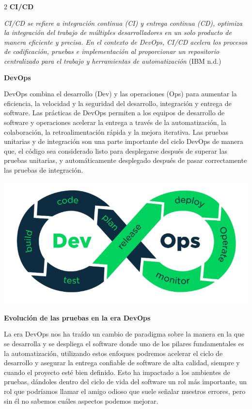 \documentclass[12pt,spanish,Letterpaper,openany]{book}
\begin{document}
\begin {multicols}{2}
\textbf{CI/CD}

\emph{CI/CD se refiere a integración continua (CI) y entrega continua (CD), optimiza la integración del trabajo de múltiples desarrolladores en un solo producto de manera eficiente y precisa. En el contexto de DevOps, CI/CD acelera los procesos de codificación, pruebas e implementación al proporcionar un repositorio centralizado para el trabajo y herramientas de automatización} (IBM n.d.)

\textbf{DevOps}

DevOps combina el desarrollo (Dev) y las operaciones (Ops) para aumentar la eficiencia, la velocidad y la seguridad del desarrollo, integración y entrega de software. Las prácticas de DevOps permiten a los equipos de desarrollo de software y operaciones acelerar la entrega a través de la automatización, la colaboración, la retroalimentación rápida y la mejora iterativa. Las pruebas unitarias y de integración son una parte importante del ciclo DevOps de manera que, el código sea considerado listo para desplegarse después de superar las pruebas unitarias, y automáticamente desplegado después de pasar correctamente las pruebas de integración.

\begin {flushleft}
\noindent\begin{minipage}[c]{\columnwidth}

\begin{center}\includegraphics[width=1\linewidth]{imagenes_articulos/sp08_01} \end{center}

\end{minipage}
\end {flushleft}

\textbf{Evolución de las pruebas en la era DevOps}

La era DevOps nos ha traído un cambio de paradigma sobre la manera en la que se desarrolla y se despliega el software donde uno de los pilares fundamentales es la automatización, utilizando estos enfoques podremos acelerar el ciclo de desarrollo y asegurar la entrega confiable de software de alta calidad, siempre y cuando el proyecto esté bien definido. Esto ha impactado a los ambientes de pruebas, dándoles dentro del ciclo de vida del software un rol más importante, un rol que podríamos llamar el amigo odioso que suele señalar nuestros errores, pero sin él no sabemos cuáles aspectos podemos mejorar.


\end{multicols}
\end{document}
